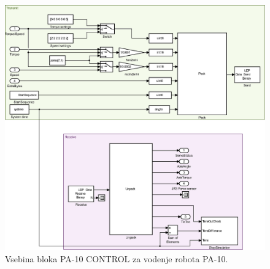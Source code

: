 \begin{figure}[!h]
	\centering
	\includegraphics[width=\textwidth]{./Slike/simulink-pa-10-inside.eps}
	\caption{Vsebina \simulink bloka PA-10 CONTROL za vodenje robota PA-10.}
	\label{fig:simulink-pa-10-inside}
\end{figure}
